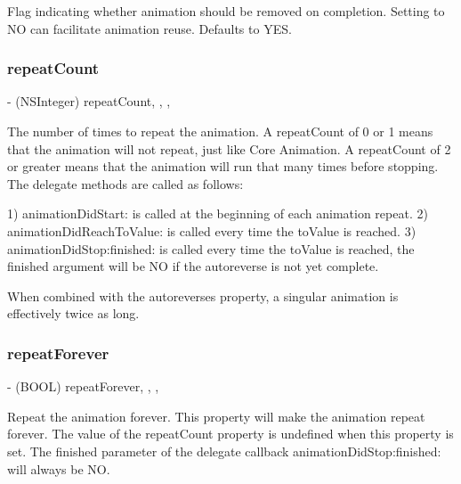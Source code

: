 Flag indicating whether animation should be removed on completion.  Setting to NO can facilitate animation reuse. Defaults to Y\+ES. \mbox{\label{interface_p_o_p_animation_acd4599f0c1d8147acbb6118c8d51ba8b}} 
\subsubsection{\texorpdfstring{repeat\+Count}{repeatCount}}
{\footnotesize\ttfamily -\/ (N\+S\+Integer) repeat\+Count\hspace{0.3cm}{\ttfamily [read]}, {\ttfamily [write]}, {\ttfamily [nonatomic]}, {\ttfamily [assign]}}

The number of times to repeat the animation.  A repeat\+Count of 0 or 1 means that the animation will not repeat, just like Core Animation. A repeat\+Count of 2 or greater means that the animation will run that many times before stopping. The delegate methods are called as follows\+: \begin{DoxyVerb}1) animationDidStart: is called at the beginning of each animation repeat.
2) animationDidReachToValue: is called every time the toValue is reached.
3) animationDidStop:finished: is called every time the toValue is reached, the finished argument will be NO if the autoreverse is not yet complete.
\end{DoxyVerb}


When combined with the autoreverses property, a singular animation is effectively twice as long. \mbox{\label{interface_p_o_p_animation_a0f886a54d7411e3b3e1ef78566c0bc30}} 
\subsubsection{\texorpdfstring{repeat\+Forever}{repeatForever}}
{\footnotesize\ttfamily -\/ (B\+O\+OL) repeat\+Forever\hspace{0.3cm}{\ttfamily [read]}, {\ttfamily [write]}, {\ttfamily [nonatomic]}, {\ttfamily [assign]}}

Repeat the animation forever.  This property will make the animation repeat forever. The value of the repeat\+Count property is undefined when this property is set. The finished parameter of the delegate callback animation\+Did\+Stop\+:finished\+: will always be NO. \mbox{\label{interface_p_o_p_animation_a99f2f80821714cc3d9eaa1c2a70c12bc}} 
